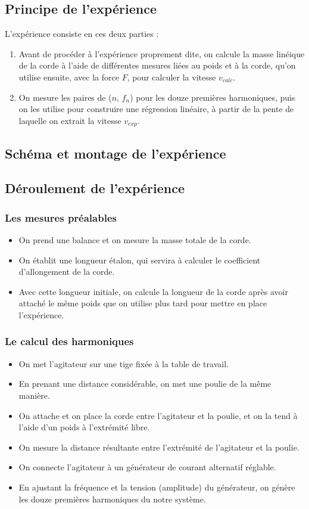 \documentclass[12pt,a4paper]{article}
\begin{document}
    \subsection{Principe de l'expérience}
    L'expérience consiste en ces deux parties :
    \begin{enumerate}
        \item Avant de procéder à l'expérience proprement dite, on calcule la masse linéique de la corde à l'aide de différentes mesures liées au poids et à la corde, qu'on utilise ensuite, avec la force $F$, pour calculer la vitesse $v_{calc}$.
        \item On mesure les paires de ($n$, $f_n$) pour les douze premières harmoniques, puis on les utilise pour construire une régression linéaire, à partir de la pente de laquelle on extrait la vitesse $v_{exp}$.
    \end{enumerate}

    \subsection{Schéma et montage de l’expérience}
    \subsection{Déroulement de l'expérience}
    \subsubsection{Les mesures préalables}
    \begin{itemize}
        \item On prend une balance et on mesure la masse totale de la corde.
        \item On établit une longueur étalon, qui servira à calculer le coefficient d'allongement de la corde.
        \item Avec cette longueur initiale, on calcule la longueur de la corde après avoir attaché le même poids que on utilise plus tard pour mettre en place l'expérience.
    \end{itemize}
    \subsubsection{Le calcul des harmoniques}
    \begin{itemize}
        \item On met l'agitateur sur une tige fixée à la table de travail.
        \item En prenant une distance considérable, on met une poulie de la même manière.
        \item On attache et on place la corde entre l'agitateur et la poulie, et on la tend à l'aide d'un poids à l'extrémité libre.
        \item On mesure la distance résultante entre l'extrémité de l'agitateur et la poulie.
        \item On connecte l'agitateur à un générateur de courant alternatif réglable.
        \item En ajustant la fréquence et la tension (amplitude) du générateur, on génère les douze premières harmoniques du notre système.
    \end{itemize}
\end{document}
